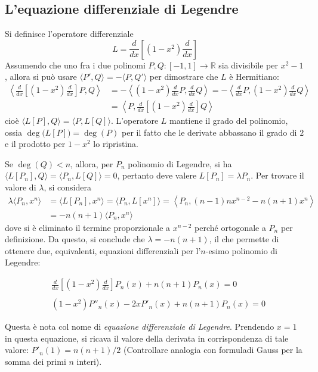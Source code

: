 \documentclass[11pt, a4paper]{scrartcl}
\theoremstyle{definition}
\numberwithin{esempio}{section}
\theoremstyle{definition}
\numberwithin{obs}{section}
\numberwithin{nota}{section}
\newenvironment{boxenv}[1][]{
    \begin{eqbox}[#1]
    }{
   \end{eqbox}
}
\numberwithin{equation}{subsection}
\begin{document}
\subsection{L'equazione differenziale di Legendre}
Si definisce l'operatore differenziale
\begin{equation}
	L = \frac{d }{d x} \left[(1-x^2) \frac{d }{d x} \right]
\end{equation}
Assumendo che uno fra i due polinomi $P,Q : [-1,1] \to \mathbb{R}$ sia divisibile per $x^2-1$, allora si pu\`o usare $\langle P',Q \rangle= -\langle P,Q' \rangle$ per dimostrare che $L$ \`e Hermitiano:
\[
	\begin{split}
		\left\langle \frac{d }{d x} \left[ (1-x^2) \frac{d }{d x}  \right] P , Q \right\rangle &= - \left\langle (1-x^2) \frac{d }{d x} P,\frac{d }{d x} Q \right\rangle =- \left\langle \frac{d }{d x} P , (1-x^2) \frac{d }{d x} Q\right\rangle\\
		&= \left\langle P, \frac{d }{d x}\left[ (1-x^2) \frac{d }{d x}  \right] Q  \right\rangle
	\end{split}
\] 
cio\`e $\langle L[P],Q \rangle= \langle P,L[Q] \rangle$.
L'operatore $L$ mantiene il grado del polinomio, ossia $\operatorname{deg} \big(L[P]\big) = \operatorname{deg}(P) $ per il fatto che le derivate abbassano il grado di $2$ e il prodotto per $1-x^2$ lo ripristina.

Se $\operatorname{deg} (Q) < n$, allora, per $P_n$ polinomio di Legendre, si ha $\langle L[P_n], Q \rangle= \langle P_n,  L[Q] \rangle= 0$, pertanto deve valere $L[P_n] = \lambda P_n$.
Per trovare il valore di $\lambda $, si considera
\[
	\begin{split}
		\lambda \langle P_n, x^n \rangle &= \langle L[P_n], x^n \rangle= \langle P_n , L[x^n] \rangle = \left\langle P_n,(n-1)nx^{n-2} -n(n+1)x^n  \right\rangle\\
						 &=-n(n+1)\langle P_n,x^n \rangle
	\end{split}
\] 
dove si \`e eliminato il termine proporzionale a $x^{n-2} $ perch\'e ortogonale a $P_n$ per definizione.
Da questo, si conclude che $\lambda = -n(n+1)$, il che permette di ottenere due, equivalenti, equazioni differenziali per l'$n$-esimo polinomio di Legendre:
\begin{boxenv}[]
\begin{equation}
	\begin{split}
		&\frac{d }{d x} \left[ (1-x^2)\frac{d }{d x}  \right] P_n(x) + n(n+1) P_n(x) = 0\\
		\\
		&(1-x^2)P''_n(x) - 2x P'_n(x) + n(n+1) P_n(x) = 0
	\end{split}
\end{equation}
\end{boxenv}
Questa \`e nota col nome di \textit{equazione differenziale di Legendre}.
Prendendo $x=1$ in questa equazione, si ricava il valore della derivata in corrispondenza di tale valore: $P'_n(1) = n(n+1) / 2$ ({\color{red}Controllare analogia con formuladi Gauss per la somma dei primi $n$ interi}).
\end{document}
